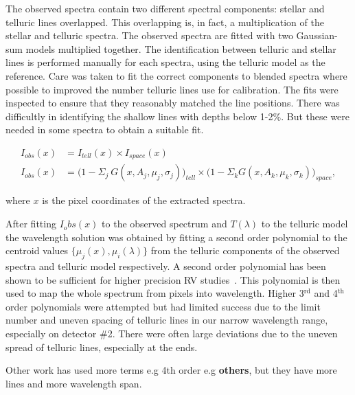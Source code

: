 The observed spectra contain two different spectral components: stellar and telluric lines overlapped. This overlapping is, in fact, a multiplication of the stellar and telluric spectra. The observed spectra are fitted with two Gaussian-sum models multiplied together. The identification between telluric and stellar lines is performed manually for each spectra, using the telluric model as the reference. Care was taken to fit the correct components to blended spectra where possible to improved the number telluric lines use for calibration. The fits were inspected to ensure that they reasonably matched the line positions. There was difficultly in identifying the shallow lines with depths below 1-2\%. But these were needed in some spectra to obtain a suitable fit. 

\begin{align}
I_{obs}(x) &= I_{tell}(x) \times I_{space}(x) \nonumber \\
I_{obs}(x) &= \Big(1 - {\Sigma}_{j}\ G(x, A_{j}, {\mu}_{j}, {\sigma}_{j})\Big)_{tell} \times \Big(1 - {\Sigma}_{k} G(x, A_{k}, {\mu}_{k}, {\sigma}_{k})\Big)_{space}, \label{eqn:obs}
\end{align}

where \(x \) is the pixel coordinates of the extracted spectra.


After fitting \(I_obs(x)\) to the observed spectrum and \(T(\lambda)\) to the telluric model the wavelength solution was obtained by fitting a second order polynomial to the centroid values \(\{\mu_{j}(x), \mu_{i}(\lambda)\} \) from the telluric components of the observed spectra and telluric model respectively. A second order polynomial has been shown to be sufficient for higher precision RV studies~\citep[e.g.][]{bean_groundbased_2010, figueira_radial_2010}. This polynomial is then used to map the whole spectrum from pixels into wavelength. Higher 3$^{\textrm{rd}}$ and 4$^{\textrm{th}}$ order polynomials were attempted but had limited success due to the limit number and uneven spacing of telluric lines in our narrow wavelength range, especially on detector \#2. There were often large deviations due to the uneven spread of telluric lines, especially at the ends.

Other work has used more terms e.g 4th order e.g \citep{piskorz_evidence_2016} \textbf{others}, but they have more lines and more wavelength span. 

